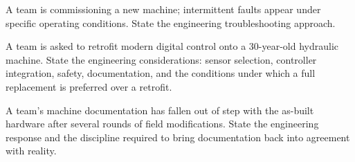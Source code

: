 \begin{exercise}
A team is commissioning a new machine; intermittent faults appear under specific operating conditions. State the engineering troubleshooting approach.
\end{exercise}

\begin{exercise}
A team is asked to retrofit modern digital control onto a 30-year-old hydraulic machine. State the engineering considerations: sensor selection, controller integration, safety, documentation, and the conditions under which a full replacement is preferred over a retrofit.
\end{exercise}

\begin{exercise}
A team's machine documentation has fallen out of step with the as-built hardware after several rounds of field modifications. State the engineering response and the discipline required to bring documentation back into agreement with reality.
\end{exercise}
